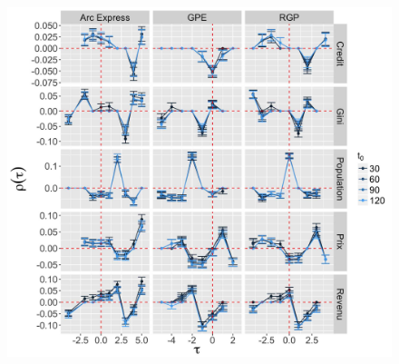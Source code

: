\begin{figure}%
\includegraphics[width=\linewidth]{Figures/Final/1-2-1-fig-casestudies-empiricalres.jpg}

\end{figure}
